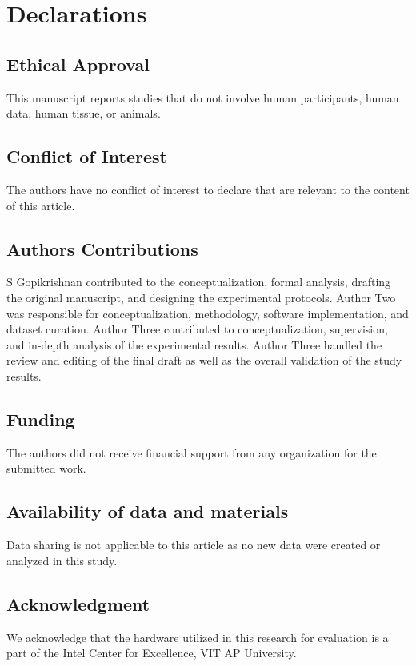 \documentclass[a4paper,fleqn]{cas-dc}
\numberwithin{equation}{section}
\begin{document}
\section*{Declarations}
\subsection*{Ethical Approval}
This manuscript reports studies that do not involve human participants, human data, human tissue, or animals.

\subsection*{Conflict of Interest}
The authors have no conflict of interest to declare that are relevant to the content of this article.

\subsection*{Authors Contributions}
S Gopikrishnan contributed to the conceptualization, formal analysis, drafting the original manuscript, and designing the experimental protocols. Author Two was responsible for conceptualization, methodology, software implementation, and dataset curation. Author Three contributed to conceptualization, supervision, and in-depth analysis of the experimental results. Author Three handled the review and editing of the final draft as well as the overall validation of the study results.

\subsection*{Funding}
The authors did not receive financial support from any organization for the submitted work.

\subsection*{Availability of data and materials}
Data sharing is not applicable to this article as no new data were created or analyzed in this study.

\subsection*{Acknowledgment}
We acknowledge that the hardware utilized in this research for evaluation is a part of the Intel Center for Excellence, VIT AP University.

\clearpage


\end{document}
